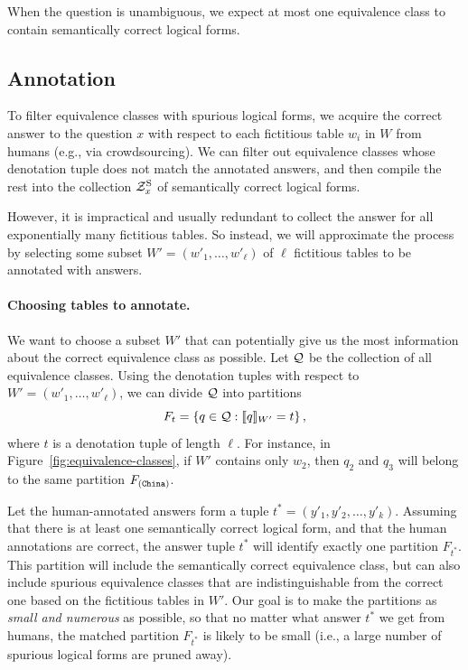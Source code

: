When the question is unambiguous,
we expect at most one equivalence class
to contain semantically correct logical forms.

\subsection{Annotation}
To filter equivalence classes with spurious logical forms,
we acquire the correct answer to the question $x$
with respect to each fictitious table $w_i$ in $W$
from humans (e.g., via crowdsourcing).
We can filter out equivalence classes
whose denotation tuple does not match the annotated answers,
and then compile the rest into the collection $\mathcal{Z}^\mathrm{S}_x$
of semantically correct logical forms.

However, it is impractical and usually redundant
to collect the answer for all exponentially many fictitious tables.
So instead, we will approximate the process
by selecting some subset
$W' = (w'_1, \dots, w'_\ell)$ of $\ell$ fictitious tables
to be annotated with answers.

\paragraph{Choosing tables to annotate.}
We want to choose a subset $W'$ that can potentially
give us the most information about the correct equivalence class
as possible.
Let $\mathcal{Q}$ be the collection of all equivalence classes.
Using the denotation tuples with respect to
$W' = (w'_1, \dots, w'_\ell)$,
we can divide $\mathcal{Q}$ into partitions
\begin{equation}
F_t = \left\{ q \in \mathcal{Q} : \llbracket{q}\rrbracket_{W'} = t \right\},
\end{equation}
where $t$ is a denotation tuple of length $\ell$.
For instance, in Figure~\ref{fig:equivalence-classes},
if $W'$ contains only $w_2$, then $q_2$ and $q_3$
will belong to the same partition $F_{(\texttt{China})}$.

Let the human-annotated answers form a tuple
$t^* = (y'_1, y'_2, \dots, y'_k)$.
Assuming that there is
at least one semantically correct logical form,
and that the human annotations are correct,
the answer tuple $t^*$ will identify exactly
one partition $F_{t^*}$.
This partition will include the
semantically correct equivalence class,
but can also include spurious equivalence classes
that are indistinguishable from the correct one based
on the fictitious tables in $W'$.
Our goal is to make the partitions as
\emph{small and numerous} as possible,
so that no matter what answer $t^*$ we get from humans,
the matched partition $F_{t^*}$ is likely to be small
(i.e., a large number of spurious logical forms are pruned away).

